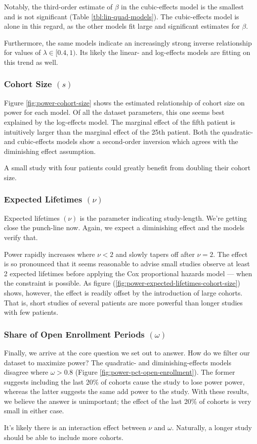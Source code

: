 Notably, the third-order estimate of $\beta$ in the cubic-effects model is the smallest and is not significant (Table \ref{tbl:lin-quad-models}). The cubic-effects model is alone in this regard, as the other models fit large and significant estimates for $\beta$.

Furthermore, the same models indicate an increasingly strong inverse relationship for values of $\lambda \in [0.4, 1)$. Its likely the linear- and log-effects models are fitting on this trend as well. 

\subsubsection{Cohort Size $(s)$}

Figure \ref{fig:power-cohort-size} shows the estimated relationship of cohort size on power for each model. Of all the dataset parameters, this one seems best explained by the log-effects model. The marginal effect of the fifth patient is intuitively larger than the marginal effect of the 25th patient. Both the quadratic- and cubic-effects models show a second-order inversion which agrees with the diminishing effect assumption. 

A small study with four patients could greatly benefit from doubling their cohort size. 

\subsubsection{Expected Lifetimes $(\nu)$}

Expected lifetimes $(\nu)$ is the parameter indicating study-length. We're getting close the punch-line now. Again, we expect a diminishing effect and the models verify that. 

Power rapidly increases where $\nu < 2$ and slowly tapers off after $\nu = 2$. The effect is so pronounced that it seems reasonable to advise small studies observe at least 2 expected lifetimes before applying the Cox proportional hazards model --- when the constraint is possible. As figure (\ref{fig:power-expected-lifetimes-cohort-size}) shows, however, the effect is readily offset by the introduction of large cohorts. That is, short studies of several patients are more powerful than longer studies with few patients. 

\subsubsection{Share of Open Enrollment Periods $(\omega)$}

Finally, we arrive at the core question we set out to answer. How do we filter our dataset to maximize power? The quadratic- and diminishing-effects models disagree where $\omega > 0.8$ (Figure \ref{fig:power-pct-open-enrollment}). The former suggests including the last 20\% of cohorts cause the study to lose power power, whereas the latter suggests the same add power to the study. With these results, we believe the answer is unimportant; the effect of the last 20\% of cohorts is very small in either case. 

It's likely there is an interaction effect between $\nu$ and $\omega$. Naturally, a longer study should be able to include more cohorts. 
